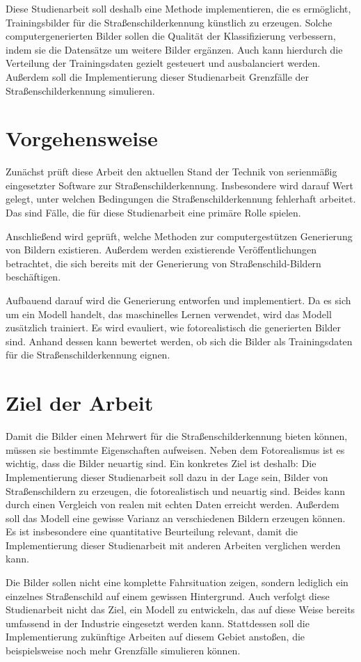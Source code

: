 Diese Studienarbeit soll deshalb eine Methode implementieren, die es ermöglicht, Trainingsbilder für die Straßenschilderkennung künstlich zu erzeugen. Solche computergenerierten Bilder sollen die Qualität der Klassifizierung verbessern, indem sie die Datensätze um weitere Bilder ergänzen. Auch kann hierdurch die Verteilung der Trainingsdaten gezielt gesteuert und ausbalanciert werden. Außerdem soll die Implementierung dieser Studienarbeit Grenzfälle der Straßenschilderkennung simulieren.

\section{Vorgehensweise}

Zunächst prüft diese Arbeit den aktuellen Stand der Technik von serienmäßig eingesetzter Software zur Straßenschilderkennung. Insbesondere wird darauf Wert gelegt, unter welchen Bedingungen die Straßenschilderkennung fehlerhaft arbeitet. Das sind Fälle, die für diese Studienarbeit eine primäre Rolle spielen.

Anschließend wird geprüft, welche Methoden zur computergestützen Generierung von Bildern existieren. Außerdem werden existierende Veröffentlichungen betrachtet, die sich bereits mit der Generierung von Straßenschild-Bildern beschäftigen. 

Aufbauend darauf wird die Generierung entworfen und implementiert. Da es sich um ein Modell handelt, das maschinelles Lernen verwendet, wird das Modell zusätzlich trainiert. Es wird evauliert, wie fotorealistisch die generierten Bilder sind. Anhand dessen kann bewertet werden, ob sich die Bilder als Trainingsdaten für die Straßenschilderkennung eignen.

\section{Ziel der Arbeit}
\label{chap:ziel-der-arbeit}

Damit die Bilder einen Mehrwert für die Straßenschilderkennung bieten können, müssen sie bestimmte Eigenschaften aufweisen. Neben dem Fotorealismus ist es wichtig, dass die Bilder neuartig sind. Ein konkretes Ziel ist deshalb: Die Implementierung dieser Studienarbeit soll dazu in der Lage sein, Bilder von Straßenschildern zu erzeugen, die  fotorealistisch und neuartig sind. Beides kann durch einen Vergleich von realen mit echten Daten erreicht werden. Außerdem soll das Modell eine gewisse Varianz an verschiedenen Bildern erzeugen können. Es ist insbesondere eine quantitative Beurteilung relevant, damit die Implementierung dieser Studienarbeit mit anderen Arbeiten verglichen werden kann.

Die Bilder sollen nicht eine komplette Fahrsituation zeigen, sondern lediglich ein einzelnes Straßenschild auf einem gewissen Hintergrund. Auch verfolgt diese Studienarbeit nicht das Ziel, ein Modell zu entwickeln, das auf diese Weise bereits umfassend in der Industrie eingesetzt werden kann. Stattdessen soll die Implementierung zukünftige Arbeiten auf diesem Gebiet anstoßen, die beispielsweise noch mehr Grenzfälle simulieren können.